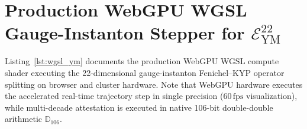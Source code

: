 \documentclass[11pt,a4paper,reqno]{article}
\theoremstyle{plain}
\theoremstyle{definition}
\theoremstyle{remark}
\numberwithin{equation}{section}
\newcommand{\Ddd}{\mathbb{D}_{106}}
\newcommand{\Eym}{\mathcal{E}_{\mathrm{YM}}^{22}}
\begin{document}
\FloatBarrier

\appendix
\section{Production WebGPU WGSL Gauge-Instanton Stepper for \texorpdfstring{$\Eym$}{E\_YM\textasciicircum 22}}
\label{app:gpu_shaders_ym}

Listing~\ref{lst:wgsl_ym} documents the production WebGPU WGSL compute shader executing the 22-dimensional gauge-instanton Fenichel--KYP operator splitting on browser and cluster hardware. Note that WebGPU hardware executes the accelerated real-time trajectory step in single precision ($60\,\mathrm{fps}$ visualization), while multi-decade attestation is executed in native 106-bit double-double arithmetic $\Ddd$.
\end{document}
